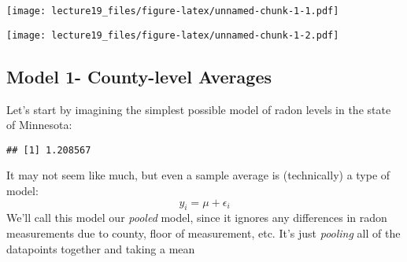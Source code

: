 \documentclass[
]{article}
\newenvironment{Shaded}{\begin{snugshade}}{\end{snugshade}}
\newcommand{\AttributeTok}[1]{\textcolor[rgb]{0.77,0.63,0.00}{#1}}
\newcommand{\CommentTok}[1]{\textcolor[rgb]{0.56,0.35,0.01}{\textit{#1}}}
\newcommand{\ConstantTok}[1]{\textcolor[rgb]{0.00,0.00,0.00}{#1}}
\newcommand{\FloatTok}[1]{\textcolor[rgb]{0.00,0.00,0.81}{#1}}
\newcommand{\FunctionTok}[1]{\textcolor[rgb]{0.00,0.00,0.00}{#1}}
\newcommand{\NormalTok}[1]{#1}
\newcommand{\OtherTok}[1]{\textcolor[rgb]{0.56,0.35,0.01}{#1}}
\newcommand{\SpecialCharTok}[1]{\textcolor[rgb]{0.00,0.00,0.00}{#1}}
\begin{document}
\begin{Shaded}
\end{Shaded}

\texttt{[image: lecture19\_files/figure-latex/unnamed-chunk-1-1.pdf]}

\begin{Shaded}
\end{Shaded}

\texttt{[image: lecture19\_files/figure-latex/unnamed-chunk-1-2.pdf]}

\hypertarget{model-1--county-level-averages}{%
\subsection{Model 1- County-level
Averages}\label{model-1--county-level-averages}}

Let's start by imagining the simplest possible model of radon levels in
the state of Minnesota:

\begin{Shaded}
\end{Shaded}

\begin{verbatim}
## [1] 1.208567
\end{verbatim}

It may not seem like much, but even a sample average is (technically) a
type of model: \[
y_i = \mu + \epsilon_i
\] We'll call this model our \emph{pooled} model, since it ignores any
differences in radon measurements due to county, floor of measurement,
etc. It's just \emph{pooling} all of the datapoints together and taking
a mean
\end{document}
